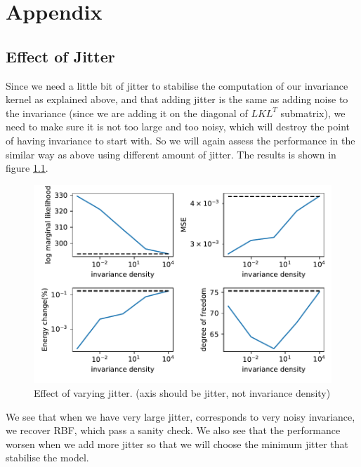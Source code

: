 \documentclass{statsmsc}
\begin{document}




\clearpage
\renewcommand*{\thepage}{A\arabic{page}}
\appendix

\chapter{Appendix}

\section{Effect of Jitter}
Since we need a little bit of jitter to stabilise the computation of our invariance kernel as explained above, and that adding jitter is the same as adding noise to the invariance (since we are adding it on the diagonal of $LKL^T$ submatrix), we need to make sure it is not too large and too noisy, which will destroy the point of having invariance to start with. 
So we will again assess the performance in the similar way as above using different amount of jitter.
The results is shown in figure \ref{fig:vary_jitter}.

\begin{figure}[H] 
  \includegraphics[width=0.8\linewidth]{../codes/figures/vary_jitter.pdf}
  \centering
  \caption{Effect of varying jitter. (axis should be jitter, not invariance density)}
  \label{fig:vary_jitter}
\end{figure}

We see that when we have very large jitter, corresponds to very noisy invariance, we recover RBF, which pass a sanity check.
We also see that the performance worsen when we add more jitter so that we will choose the minimum jitter that stabilise the model.
\end{document}
